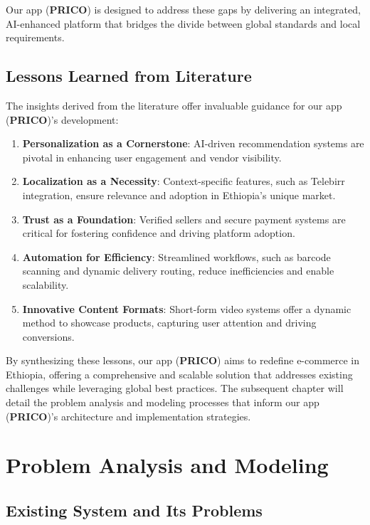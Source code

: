 \documentclass[12pt]{report}
\begin{document}
Our app (\textbf{PRICO}) is designed to address these gaps by delivering an integrated, AI-enhanced
platform that bridges the divide between global standards and local requirements.

\section{Lessons Learned from Literature}

The insights derived from the literature offer invaluable guidance for our app (\textbf{PRICO})’s
development:

\begin{enumerate}

	\item \textbf{Personalization as a Cornerstone}: AI-driven recommendation systems are pivotal in
	      enhancing user engagement and vendor visibility.
	\item \textbf{Localization as a Necessity}: Context-specific features, such as Telebirr integration,
	      ensure relevance and adoption in Ethiopia’s unique market.
	\item \textbf{Trust as a Foundation}: Verified sellers and secure payment systems are critical for
	      fostering confidence and driving platform adoption.
	\item \textbf{Automation for Efficiency}: Streamlined workflows, such as barcode scanning and
	      dynamic delivery routing, reduce inefficiencies and enable scalability.
	\item \textbf{Innovative Content Formats}: Short-form video systems offer a dynamic method to
	      showcase products, capturing user attention and driving conversions. \cite{c19}

\end{enumerate}

By synthesizing these lessons, our app (\textbf{PRICO}) aims to redefine e-commerce in Ethiopia,
offering a comprehensive and scalable solution that addresses existing challenges while
leveraging global best practices. The subsequent chapter will detail the problem analysis and
modeling processes that inform our app (\textbf{PRICO})’s architecture and implementation
strategies.

\chapter{Problem Analysis and Modeling}

\section{Existing System and Its Problems}
\end{document}
